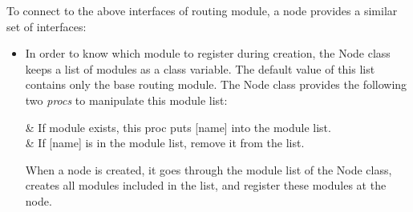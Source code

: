 To connect to the above interfaces of routing module, a node provides
a similar set of interfaces:
\begin{itemize}
\item %
  In order to know which module to register during creation, the Node
  class keeps a list of modules as a class variable. 
  The default value of this list contains only the base routing
  module.
  The Node class provides the following two {\em procs} to manipulate
  this module list:
  \begin{alist}
     & If module
     exists, this proc puts [name] into the
    module list. \\ 
     & If
    [name] is in the module 
    list, remove it from the list. 
  \end{alist}
  When a node is created, it goes through the module list of the Node
  class, creates all modules included in the list, and register these
  modules at the node.


\end{itemize}
